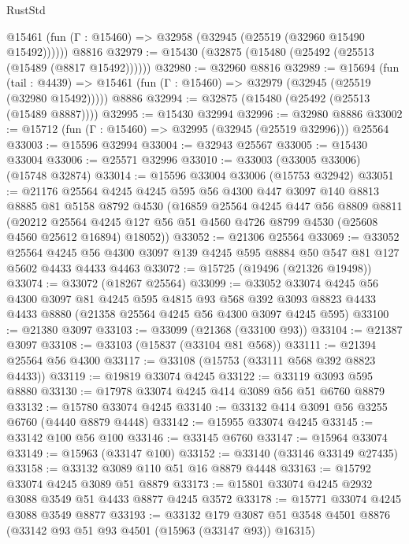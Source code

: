 \begin{lexlean}{RustStd}
\begin{coremodule}
{\begin{coremodule}
{{{{{{{{{{{{{{{{{{{{{{{{{{{{{{{{{{{{{{{{{{{{{{{{{{{{{{{{{{{{      @15461 (fun (Γ : @15460) => @32958 (@32945 (@25519 (@32960 @15490 @15492))))))
    @8816
@32979 := @15430 (@32875 (@15480 (@25492 (@25513 (@15489 (@8817 @15492))))))
@32980 := @32960 @8816
@32989 := @15694
    (fun (tail : @4439) => @15461 (fun (Γ : @15460) => @32979 (@32945 (@25519 (@32980 @15492)))))
    @8886
@32994 := @32875 (@15480 (@25492 (@25513 (@15489 @8887))))
@32995 := @15430 @32994
@32996 := @32980 @8886
@33002 := @15712 (fun (Γ : @15460) => @32995 (@32945 (@25519 @32996))) @25564
@33003 := @15596 @32994
@33004 := @32943 @25567
@33005 := @15430 @33004
@33006 := @25571 @32996
@33010 := @33003 (@33005 @33006) (@15748 @32874)
@33014 := @15596 @33004 @33006 (@15753 @32942)
@33051 := @21176
    @25564
    @4245
    @4245
    @595
    @56
    @4300
    @447
    @3097
    @140
    @8813
    @8885
    @81
    @5158
    @8792
    @4530
    (@16859
      @25564
      @4245
      @447
      @56
      @8809
      @8811
      (@20212
        @25564
        @4245
        @127
        @56
        @51
        @4560
        @4726
        @8799
        @4530
        (@25608 @4560 @25612 @16894)
        @18052))
@33052 := @21306 @25564
@33069 := @33052
    @25564
    @4245
    @56
    @4300
    @3097
    @139
    @4245
    @595
    @8884
    @50
    @547
    @81
    @127
    @5602
    @4433
    @4433
    @4463
@33072 := @15725 (@19496 (@21326 @19498))
@33074 := @33072 (@18267 @25564)
@33099 := @33052
    @33074
    @4245
    @56
    @4300
    @3097
    @81
    @4245
    @595
    @4815
    @93
    @568
    @392
    @3093
    @8823
    @4433
    @4433
    @8880
    (@21358 @25564 @4245 @56 @4300 @3097 @4245 @595)
@33100 := @21380 @3097
@33103 := @33099 (@21368 (@33100 @93))
@33104 := @21387 @3097
@33108 := @33103 (@15837 (@33104 @81 @568))
@33111 := @21394 @25564 @56 @4300
@33117 := @33108 (@15753 (@33111 @568 @392 @8823 @4433))
@33119 := @19819 @33074 @4245
@33122 := @33119 @3093 @595 @8880
@33130 := @17978 @33074 @4245 @414 @3089 @56 @51 @6760 @8879
@33132 := @15780 @33074 @4245
@33140 := @33132 @414 @3091 @56 @3255 @6760 (@4440 @8879 @4448)
@33142 := @15955 @33074 @4245
@33145 := @33142 @100 @56 @100
@33146 := @33145 @6760
@33147 := @15964 @33074
@33149 := @15963 (@33147 @100)
@33152 := @33140 (@33146 @33149 @27435)
@33158 := @33132 @3089 @110 @51 @16 @8879 @4448
@33163 := @15792 @33074 @4245 @3089 @51 @8879
@33173 := @15801 @33074 @4245 @2932 @3088 @3549 @51 @4433 @8877 @4245 @3572
@33178 := @15771 @33074 @4245 @3088 @3549 @8877
@33193 := @33132
    @179
    @3087
    @51
    @3548
    @4501
    @8876
    (@33142 @93 @51 @93 @4501 (@15963 (@33147 @93)) @16315)
}}}}}}}}}}}}}}}}}}}}}}}}}}}}}}}}}}}}}}}}}}}}}}}}}}}}}}}}}}}}
\end{coremodule}}
\end{coremodule}
\end{lexlean}
